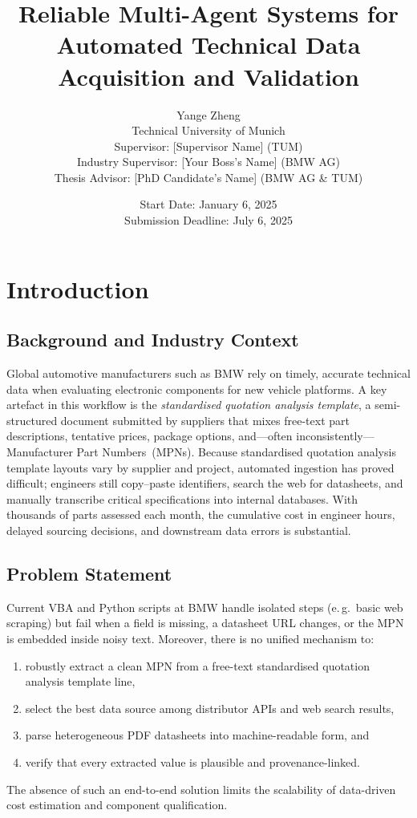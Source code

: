 \documentclass[11pt]{article}
\title{\textbf{Reliable Multi-Agent Systems for Automated Technical Data Acquisition and Validation}}
\author{
  Yange Zheng \\
  Technical University of Munich \\
  Supervisor: [Supervisor Name] (TUM) \\
  Industry Supervisor: [Your Boss's Name] (BMW AG) \\
  Thesis Advisor: [PhD Candidate's Name] (BMW AG \& TUM)
}
\date{Start Date: January 6, 2025 \\
Submission Deadline: July 6, 2025}
\begin{document}
\maketitle

\tableofcontents
\newpage

\section{Introduction}

\subsection{Background and Industry Context}
Global automotive manufacturers such as BMW rely on timely, accurate technical data when evaluating electronic components for new vehicle platforms.  
A key artefact in this workflow is the \emph{standardised quotation analysis template}, a semi-structured document submitted by suppliers that mixes free-text part descriptions, tentative prices, package options, and—often inconsistently—Manufacturer Part Numbers~(MPNs).  
Because standardised quotation analysis template layouts vary by supplier and project, automated ingestion has proved difficult; engineers still copy–paste identifiers, search the web for datasheets, and manually transcribe critical specifications into internal databases.  
With thousands of parts assessed each month, the cumulative cost in engineer hours, delayed sourcing decisions, and downstream data errors is substantial.

\subsection{Problem Statement}
Current VBA and Python scripts at BMW handle isolated steps (e.\,g.\ basic web scraping) but fail when a field is missing, a datasheet URL changes, or the MPN is embedded inside noisy text.  
Moreover, there is no unified mechanism to:  
\begin{enumerate}
  \item robustly extract a clean MPN from a free-text standardised quotation analysis template line,
  \item select the best data source among distributor APIs and web search results,
  \item parse heterogeneous PDF datasheets into machine-readable form, and
  \item verify that every extracted value is plausible and provenance-linked.
\end{enumerate}
The absence of such an end-to-end solution limits the scalability of data-driven cost estimation and component qualification.
\end{document}
